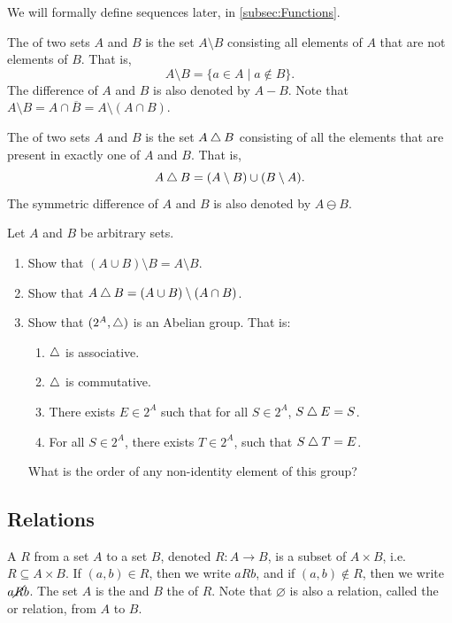 \begin{Note*}
We will formally define sequences later, in \cref{subsec:Functions}.
\end{Note*}

The  of two sets $A$ and $B$ is the set $A \setminus B$ consisting all elements of $A$ that are not elements of $B$. That is,
\begin{equation*}
A \setminus B = \{ a \in A \mid a \notin B \}.
\end{equation*}
The difference of $A$ and $B$ is also denoted by $A - B$. Note that $A \setminus B = A \cap \overline B = A \setminus (A \cap B)$.

The  of two sets $A$ and $B$ is the set $A \mathbin{\triangle} B$ consisting of all the elements that are present in exactly one of $A$ and $B$. That is,
\begin{equation*}
A \mathbin{\triangle} B = (A \setminus B) \cup (B \setminus A).
\end{equation*}
The symmetric difference of $A$ and $B$ is also denoted by $A \ominus B$.

\begin{Exercise}
Let $A$ and $B$ be arbitrary sets.
\begin{enumerate}
\item Show that $(A \cup B) \setminus B = A \setminus B$.
\item Show that $A \mathbin{\triangle} B = (A \cup B) \setminus (A \cap B)$.
\item Show that $(2^A, \mathbin{\triangle})$ is an Abelian group. That is:
    \begin{enumerate}[label=(\roman*)]
    \item $\mathbin{\triangle}$ is associative.
    \item $\mathbin{\triangle}$ is commutative.
    \item There exists $E \in 2^A$ such that for all $S \in 2^A$, $S \mathbin{\triangle} E = S$.
    \item For all $S \in 2^A$, there exists $T \in 2^A$, such that $S \mathbin{\triangle} T = E$.
    \end{enumerate}
    What is the order of any non-identity element of this group?
\end{enumerate}
\end{Exercise}

\subsection{Relations}\label{subsec:Relations}
A  $R$ from a set $A$ to a set $B$, denoted $R \colon A \to B$, is a subset of $A \times B$, i.e.\ $R \subseteq A \times B$. If $(a, b) \in R$, then we write $aRb$, and if $(a, b) \notin R$, then we write $a \cancel{R} b$. The set $A$ is the  and $B$ the  of $R$. Note that $\varnothing$ is also a relation, called the  or  relation, from $A$ to $B$.

